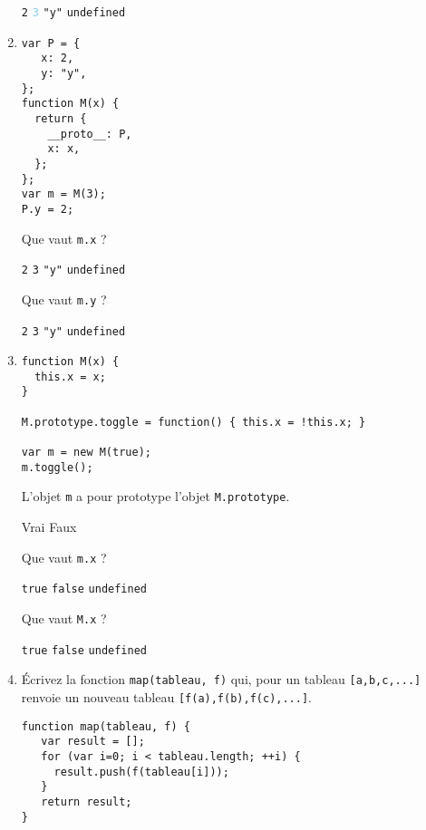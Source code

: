 \documentclass[a4paper, 12pt]{article}
\newcommand{\fullpoint}[1]{\textcolor{RubineRed}{#1}}
\newcommand{\halfpoint}[1]{\textcolor{SkyBlue}{#1}}
\newcommand{\choice}[1]{\Square\hspace{2pt} #1\hspace{5pt}}
\newcommand{\choiceg}[1]{\fullpoint{\XBox\hspace{2pt} #1\hspace{5pt}}}
\newcommand{\choicec}[1]{\Square\hspace{2pt} \lstinline{#1}\hspace{5pt}}
\newcommand{\choicecg}[1]{\fullpoint{\XBox\hspace{2pt} \lstinline{#1}\hspace{5pt}}}
\newcommand{\choicecgh}[1]{\halfpoint{\XBox\hspace{2pt} \lstinline{#1}\hspace{5pt}}}
\begin{document}
\begin{enumerate}
  \choicec{2} \choicecgh{3} \choicec{"y"} \choicec{undefined}
\item \lstset{language=javascript}
\begin{lstlisting}
var P = {
   x: 2,
   y: "y",
};
function M(x) {
  return {
    __proto__: P,
    x: x,
  };
};
var m = M(3);
P.y = 2;
\end{lstlisting}

  Que vaut \lstinline{m.x} ?

  \choicec{2} \choicecg{3} \choicec{"y"} \choicec{undefined}

  Que vaut \lstinline{m.y} ?

  \choicecg{2} \choicec{3} \choicec{"y"} \choicec{undefined}
\item \lstset{language=javascript}
\begin{lstlisting}
function M(x) {
  this.x = x;
}

M.prototype.toggle = function() { this.x = !this.x; }

var m = new M(true);
m.toggle();
\end{lstlisting}

  L'objet \lstinline{m} a pour prototype l'objet
  \lstinline{M.prototype}.

  \choiceg{Vrai} \choice{Faux}

  Que vaut \lstinline{m.x} ?

  \choicec{true} \choicecg{false} \choicec{undefined}

  Que vaut \lstinline{M.x} ?

  \choicec{true} \choicec{false} \choicecg{undefined}
\item Écrivez la fonction \lstinline{map(tableau, f)} qui, pour un
  tableau \lstinline{[a,b,c,...]} renvoie un nouveau tableau
  \lstinline{[f(a),f(b),f(c),...]}.

\lstset{language=javascript}
\begin{lstlisting}
function map(tableau, f) {
   var result = [];
   for (var i=0; i < tableau.length; ++i) {
     result.push(f(tableau[i]));
   }
   return result;
}
\end{lstlisting}
\end{enumerate}
\end{document}
